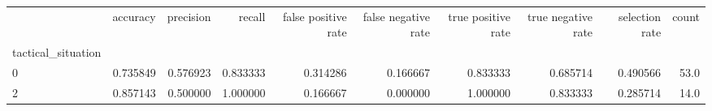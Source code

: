 \begin{tabular}{lrrrrrrrrr}
\toprule
{} &  accuracy &  precision &    recall &  false positive rate &  false negative rate &  true positive rate &  true negative rate &  selection rate &  count \\
tactical\_situation &           &            &           &                      &                      &                     &                     &                 &        \\
\midrule
0                  &  0.735849 &   0.576923 &  0.833333 &             0.314286 &             0.166667 &            0.833333 &            0.685714 &        0.490566 &   53.0 \\
2                  &  0.857143 &   0.500000 &  1.000000 &             0.166667 &             0.000000 &            1.000000 &            0.833333 &        0.285714 &   14.0 \\
\bottomrule
\end{tabular}
